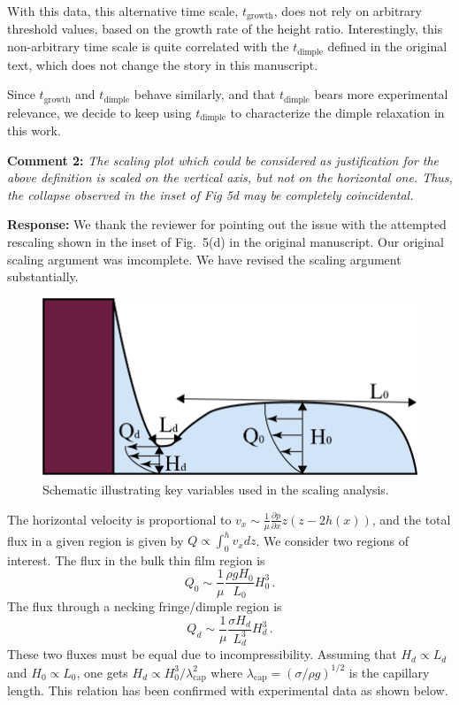 \documentclass[11pt]{article}
\begin{document}
With this data, this alternative time scale, $t_\mathrm{growth}$, does not rely on arbitrary threshold values, based on the growth rate of the height ratio. Interestingly, this non-arbitrary time scale is quite correlated with the $t_\mathrm{dimple}$ defined in the original text, which does not change the story in this manuscript.

Since $t_\mathrm{growth}$ and $t_\mathrm{dimple}$ behave similarly, and that $t_\mathrm{dimple}$ bears more experimental relevance, we decide to keep using $t_\mathrm{dimple}$ to characterize the dimple relaxation in this work. 

\bigskip
\begin{siderules}
\textbf{Comment 2:} \textit{The scaling plot which could be considered as justification for the above definition is scaled on the vertical axis, but not on the horizontal one. Thus, the collapse observed in the inset of Fig 5d may be completely coincidental.}
\end{siderules}

\textbf{Response:} We thank the reviewer for pointing out the issue with the attempted rescaling shown in the inset of Fig.~5(d) in the original manuscript. 
Our original scaling argument was imcomplete.  
We have revised the scaling argument substantially.

\begin{figure}[ht]
    \centering
    \includegraphics[width=0.4\linewidth]{Responses/rfigs/Schematic.png}
    \caption{Schematic illustrating key variables used in the scaling analysis. }
    \label{fig:Schematic}
\end{figure}



The horizontal velocity is proportional to $ v_x \sim \frac{1}{\mu} \frac{\partial p}{\partial x} z (z- 2h(x))$, and the total flux in a given region is given by $Q \propto \int_0^h v_x dz$. We consider two regions of interest. The flux in the bulk thin film region is 
\begin{equation}
    Q_0 \sim \frac{1}{\mu} \frac{\rho g H_0}{L_0} {H_0^3} \,. 
\end{equation}
The flux through a necking fringe/dimple region is
\begin{equation}
    Q_d \sim \frac{1}{\mu} \frac{\sigma H_d}{L_d^3} {H_d^3} \,. 
\end{equation}
These two fluxes must be equal due to incompressibility.
Assuming that $H_d \propto L_d$ and $H_0 \propto L_0$, one gets 
$H_d \propto H_0^3/\lambda_\mathrm{cap}^2$ where $\lambda_\mathrm{cap} = (\sigma/\rho g)^{1/2}$ is the capillary length. This relation has been confirmed with experimental data as shown below. 
\end{document}
